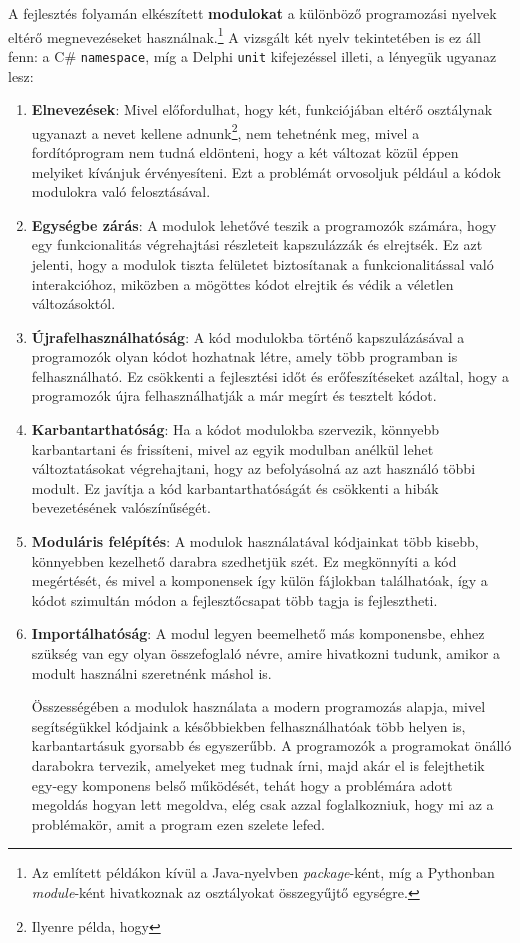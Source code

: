 \documentclass[tocnopagenum]{thesis-ekf}
\theoremstyle{definition}
\theoremstyle{remark}
\begin{document}
	A fejlesztés folyamán elkészített \textbf{modulokat} a különböző programozási nyelvek eltérő megnevezéseket használnak.\footnote{Az említett példákon kívül a Java-nyelvben \textit{package}-ként, míg a Pythonban \textit{module}-ként hivatkoznak az osztályokat összegyűjtő egységre.} A vizsgált két nyelv tekintetében is ez áll fenn: a C\# \verb|namespace|, míg a Delphi \verb|unit| kifejezéssel illeti, a lényegük ugyanaz lesz: 
	\begin{enumerate}
		\item \textbf{Elnevezések}: Mivel előfordulhat, hogy két, funkciójában eltérő osztálynak ugyanazt a nevet kellene adnunk\footnote{Ilyenre példa, hogy }, nem tehetnénk meg, mivel a fordítóprogram nem tudná eldönteni, hogy a két változat közül éppen melyiket kívánjuk érvényesíteni. Ezt a problémát orvosoljuk például a kódok modulokra való felosztásával.
		
		\item \textbf{Egységbe zárás}: A modulok lehetővé teszik a programozók számára, hogy egy funkcionalitás végrehajtási részleteit kapszulázzák és elrejtsék. Ez azt jelenti, hogy a modulok tiszta felületet biztosítanak a funkcionalitással való interakcióhoz, miközben a mögöttes kódot elrejtik és védik a véletlen változásoktól.
		
		\item \textbf{Újrafelhasználhatóság}: A kód modulokba történő kapszulázásával a programozók olyan kódot hozhatnak létre, amely több programban is felhasználható. Ez csökkenti a fejlesztési időt és erőfeszítéseket azáltal, hogy a programozók újra felhasználhatják a már megírt és tesztelt kódot.
		
		\item \textbf{Karbantarthatóság}: Ha a kódot modulokba szervezik, könnyebb karbantartani és frissíteni, mivel az egyik modulban anélkül lehet változtatásokat végrehajtani, hogy az befolyásolná az azt használó többi modult. Ez javítja a kód karbantarthatóságát és csökkenti a hibák bevezetésének valószínűségét.
		
		\item \textbf{Moduláris felépítés}: A modulok használatával kódjainkat több kisebb, könnyebben kezelhető darabra szedhetjük szét. Ez megkönnyíti a kód megértését, és mivel a komponensek így külön fájlokban találhatóak, így a kódot szimultán módon a fejlesztőcsapat több tagja is fejlesztheti.
		
		\item \textbf{Importálhatóság}: A modul legyen beemelhető más komponensbe, ehhez szükség van egy olyan összefoglaló névre, amire hivatkozni tudunk, amikor a modult használni szeretnénk máshol is.
		
		Összességében a modulok használata a modern programozás alapja, mivel segítségükkel kódjaink a későbbiekben felhasználhatóak több helyen is, karbantartásuk gyorsabb és egyszerűbb. A programozók a programokat önálló darabokra tervezik, amelyeket meg tudnak írni, majd akár el is felejthetik egy-egy komponens belső működését, tehát hogy a problémára adott megoldás hogyan lett megoldva, elég csak azzal foglalkozniuk, hogy mi az a problémakör, amit a program ezen szelete lefed.
	\end{enumerate} \cite{delphi_basics}
	
\end{document}
